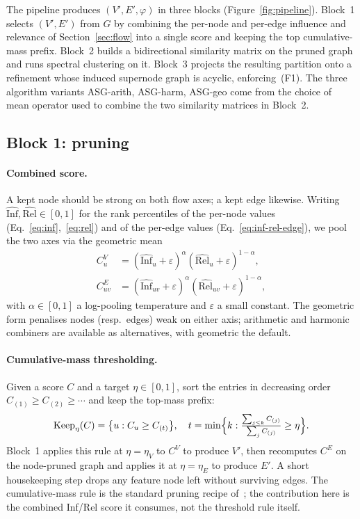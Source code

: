 The pipeline produces $(V', E', \varphi)$ in three blocks
(Figure~\ref{fig:pipeline}). Block~1 selects $(V', E')$ from $G$ by
combining the per-node and per-edge influence and relevance of
Section~\ref{sec:flow} into a single score and keeping the top
cumulative-mass prefix. Block~2 builds a bidirectional similarity
matrix on the pruned graph and runs spectral clustering on it.
Block~3 projects the resulting partition onto a refinement whose
induced supernode graph is acyclic, enforcing~(F1). The three
algorithm variants ASG-arith, ASG-harm, ASG-geo come from the choice
of mean operator used to combine the two similarity matrices in
Block~2.

\subsection{Block 1: pruning}\label{sec:solution-prune}

\paragraph{Combined score.}
A kept node should be strong on both flow axes; a kept edge likewise.
Writing $\widehat{\mathrm{Inf}}, \widehat{\mathrm{Rel}} \in [0, 1]$
for the rank percentiles of the per-node values
(Eq.~\eqref{eq:inf},~\eqref{eq:rel}) and of the per-edge values
(Eq.~\eqref{eq:inf-rel-edge}), we pool the two axes via the
geometric mean
\begin{equation}
\begin{aligned}
C^V_u    &= (\widehat{\mathrm{Inf}}_u    + \varepsilon)^\alpha
            (\widehat{\mathrm{Rel}}_u    + \varepsilon)^{1-\alpha}, \\
C^E_{uv} &= (\widehat{\mathrm{Inf}}_{uv} + \varepsilon)^\alpha
            (\widehat{\mathrm{Rel}}_{uv} + \varepsilon)^{1-\alpha},
\end{aligned}
\label{eq:CV-CE}
\end{equation}
with $\alpha \in [0, 1]$ a log-pooling temperature and $\varepsilon$
a small constant. The geometric form penalises nodes (resp.\ edges)
weak on either axis; arithmetic and harmonic combiners are available
as alternatives, with geometric the default.

\paragraph{Cumulative-mass thresholding.}
Given a score $C$ and a target $\eta \in [0, 1]$, sort the entries
in decreasing order $C_{(1)} \ge C_{(2)} \ge \cdots$ and keep the
top-mass prefix:
\begin{equation}
\mathrm{Keep}_\eta(C)
= \bigl\{u : C_u \ge C_{(t)}\bigr\}, \quad
t = \min\Bigl\{k : \tfrac{\sum_{j \le k} C_{(j)}}{\sum_j C_{(j)}} \ge \eta\Bigr\}.
\label{eq:cum-mass}
\end{equation}
Block~1 applies this rule at $\eta = \eta_V$ to $C^V$ to produce
$V'$, then recomputes $C^E$ on the node-pruned graph and applies it
at $\eta = \eta_E$ to produce $E'$. A short housekeeping step drops
any feature node left without surviving edges. The cumulative-mass
rule is the standard pruning recipe of~\cite{ameisen2024scaling};
the contribution here is the combined Inf/Rel score it consumes,
not the threshold rule itself.

